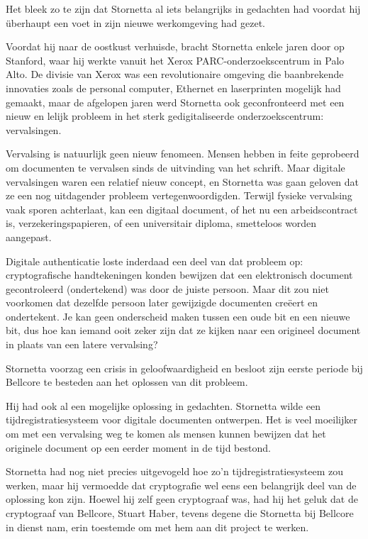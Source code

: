 \documentclass[
  a5paper,
  smalldemyvopaper,11pt,twoside,onecolumn,openright,extrafontsizes]{memoir}
\begin{document}
Het bleek zo te zijn dat Stornetta al iets belangrijks in gedachten had
voordat hij überhaupt een voet in zijn nieuwe werkomgeving had gezet.

Voordat hij naar de oostkust verhuisde, bracht Stornetta enkele jaren
door op Stanford, waar hij werkte vanuit het Xerox
PARC-onderzoekscentrum in Palo Alto. De divisie van Xerox was een
revolutionaire omgeving die baanbrekende innovaties zoals de personal
computer, Ethernet en laserprinten mogelijk had gemaakt, maar de
afgelopen jaren werd Stornetta ook geconfronteerd met een nieuw en
lelijk probleem in het sterk gedigitaliseerde onderzoekscentrum:
vervalsingen.

Vervalsing is natuurlijk geen nieuw fenomeen. Mensen hebben in feite
geprobeerd om documenten te vervalsen sinds de uitvinding van het
schrift. Maar digitale vervalsingen waren een relatief nieuw concept, en
Stornetta was gaan geloven dat ze een nog uitdagender probleem
vertegenwoordigden. Terwijl fysieke vervalsing vaak sporen achterlaat,
kan een digitaal document, of het nu een arbeidscontract is,
verzekeringspapieren, of een universitair diploma, smetteloos worden
aangepast.

Digitale authenticatie loste inderdaad een deel van dat probleem op:
cryptografische handtekeningen konden bewijzen dat een elektronisch
document gecontroleerd (ondertekend) was door de juiste persoon. Maar
dit zou niet voorkomen dat dezelfde persoon later gewijzigde documenten
creëert en ondertekent. Je kan geen onderscheid maken tussen een oude
bit en een nieuwe bit, dus hoe kan iemand ooit zeker zijn dat ze kijken
naar een origineel document in plaats van een latere vervalsing?

Stornetta voorzag een crisis in geloofwaardigheid en besloot zijn eerste
periode bij Bellcore te besteden aan het oplossen van dit probleem.

Hij had ook al een mogelijke oplossing in gedachten. Stornetta wilde een
tijdregistratiesysteem voor digitale documenten ontwerpen. Het is veel
moeilijker om met een vervalsing weg te komen als mensen kunnen bewijzen
dat het originele document op een eerder moment in de tijd bestond.

Stornetta had nog niet precies uitgevogeld hoe zo'n
tijdregistratiesysteem zou werken, maar hij vermoedde dat cryptografie
wel eens een belangrijk deel van de oplossing kon zijn. Hoewel hij zelf
geen cryptograaf was, had hij het geluk dat de cryptograaf van Bellcore,
Stuart Haber, tevens degene die Stornetta bij Bellcore in dienst nam,
erin toestemde om met hem aan dit project te werken.
\end{document}
